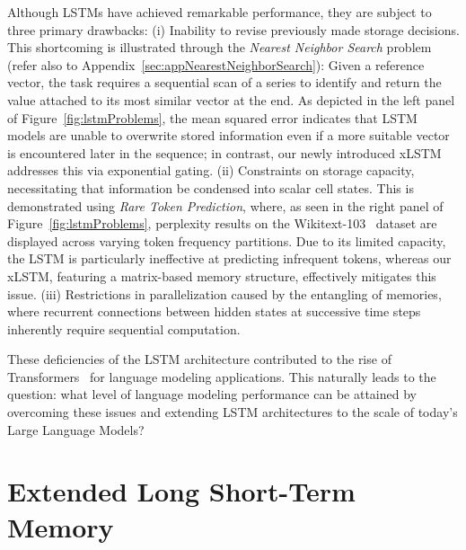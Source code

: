 Although LSTMs have achieved remarkable performance, they are subject to three primary drawbacks: (i) Inability to revise previously made storage decisions. This shortcoming is illustrated through the {\it Nearest Neighbor Search} problem (refer also to Appendix~\ref{sec:appNearestNeighborSearch}): Given a reference vector, the task requires a sequential scan of a series to identify and return the value attached to its most similar vector at the end. As depicted in the left panel of Figure~\ref{fig:lstmProblems}, the mean squared error indicates that LSTM models are unable to overwrite stored information even if a more suitable vector is encountered later in the sequence; in contrast, our newly introduced xLSTM addresses this via exponential gating. (ii) Constraints on storage capacity, necessitating that information be condensed into scalar cell states. This is demonstrated using {\it Rare Token Prediction}, where, as seen in the right panel of Figure~\ref{fig:lstmProblems}, perplexity results on the Wikitext-103~\citep{Merity:17} dataset are displayed across varying token frequency partitions. Due to its limited capacity, the LSTM is particularly ineffective at predicting infrequent tokens, whereas our xLSTM, featuring a matrix-based memory structure, effectively mitigates this issue. (iii) Restrictions in parallelization caused by the entangling of memories, where recurrent connections between hidden states at successive time steps inherently require sequential computation.

These deficiencies of the LSTM architecture contributed to the rise of Transformers~\citep{Vaswani:17} for language modeling applications. This naturally leads to the question: what level of language modeling performance can be attained by overcoming these issues and extending LSTM architectures to the scale of today’s Large Language Models?

\section{Extended Long Short-Term Memory}
\label{sec:xLSTM}

